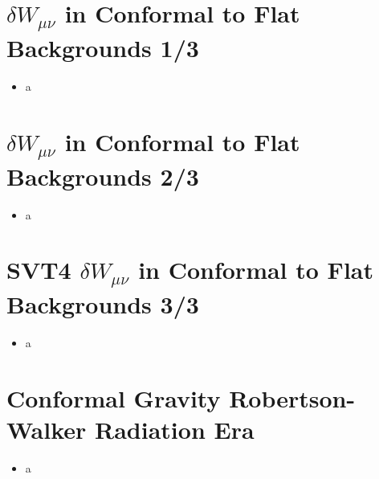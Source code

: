 \documentclass[10pt,letterpaper]{article}
\numberwithin{equation}{section}
\begin{document}

\section{$\delta W_{\mu\nu}$ in Conformal to Flat Backgrounds 1/3}
\begin{itemize}
	\item a
\end{itemize}


\section{$\delta W_{\mu\nu}$ in Conformal to Flat Backgrounds 2/3}
\begin{itemize}
	\item a
\end{itemize}


\section{SVT4 $\delta W_{\mu\nu}$ in Conformal to Flat Backgrounds 3/3}
\begin{itemize}
	\item a
\end{itemize}


\section{Conformal Gravity Robertson-Walker Radiation Era}
\begin{itemize}
	\item a
\end{itemize}
\end{document}
